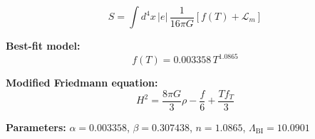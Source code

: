 
\begin{equation}
  S = \int d^4x \, |e| \, \frac{1}{16\pi G} \left[ f(T) + \mathcal{L}_m \right]
\end{equation}

\textbf{Best-fit model:}
\begin{equation}
  f(T) = 0.003358 \, T^{1.0865}
\end{equation}

\textbf{Modified Friedmann equation:}
\begin{equation}
  H^2 = \frac{8\pi G}{3} \rho - \frac{f}{6} + \frac{T f_T}{3}
\end{equation}

\textbf{Parameters:}
$\alpha = 0.003358$, \quad
$\beta = 0.307438$, \quad
$n = 1.0865$, \quad
$\Lambda_{\text{BI}} = 10.0901$